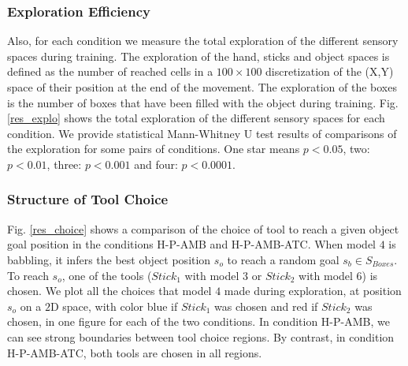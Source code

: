 \documentclass[10pt,letterpaper]{article}
\begin{document}
		
	
	
	\subsubsection{Exploration Efficiency}

		Also, for each condition we measure the total exploration of the different sensory spaces during training. 
		The exploration of the hand, sticks and object spaces is defined as the number of reached cells 
		in a $100\times100$ discretization of the (X,Y) space of their position at the end of the movement.
		The exploration of the boxes is the number of boxes that have been filled with the object during training.
		Fig. \ref{res_explo} shows the total exploration of the different sensory spaces for each condition.
		We provide statistical Mann-Whitney U test results of comparisons of the exploration for some pairs of conditions.
		One star means $p<0.05$, two: $p<0.01$, three: $p<0.001$ and four: $p<0.0001$.
		

	
	\subsubsection{Structure of Tool Choice}

		Fig. \ref{res_choice} shows a comparison of the choice of tool to reach a given object goal position in the conditions H-P-AMB and H-P-AMB-ATC.
		When model $4$ is babbling, it infers the best object position $s_o$ to reach a random goal $s_b \in S_{Boxes}$.
		To reach $s_o$, one of the tools ($Stick_1$ with model $3$ or $Stick_2$ with model $6$) is chosen. 
		We plot all the choices that model $4$ made during exploration, at position $s_o$ on a $2$D space, with color blue if $Stick_1$ was chosen and red if $Stick_2$ was chosen, 
		in one figure for each of the two conditions.
		In condition H-P-AMB, we can see strong boundaries between tool choice regions.
		By contrast, in condition H-P-AMB-ATC, both tools are chosen in all regions.
\end{document}
